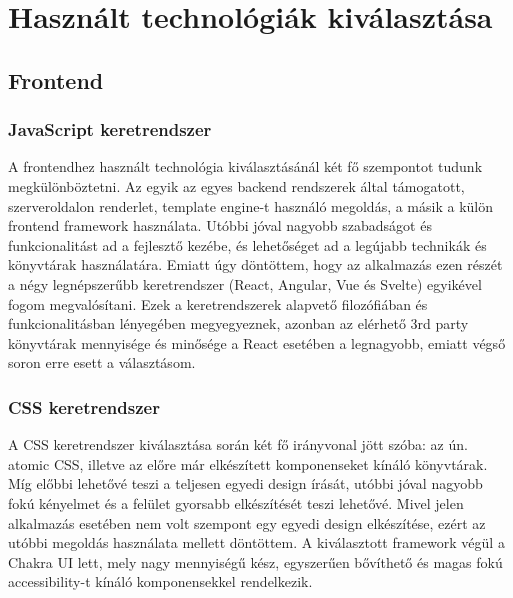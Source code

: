 \chapter{Használt technológiák kiválasztása}

\section{Frontend}
\subsection{JavaScript keretrendszer}
A frontendhez használt technológia kiválasztásánál két fő szempontot tudunk megkülönböztetni.
Az egyik az egyes backend rendszerek által támogatott, szerveroldalon renderlet, template engine-t használó megoldás, a másik a külön frontend framework használata.
Utóbbi jóval nagyobb szabadságot és funkcionalitást ad a fejlesztő kezébe, és lehetőséget ad a legújabb technikák és könyvtárak használatára.
Emiatt úgy döntöttem, hogy az alkalmazás ezen részét a négy legnépszerűbb keretrendszer (React, Angular, Vue és Svelte) egyikével fogom megvalósítani.
Ezek a keretrendszerek alapvető filozófiában és funkcionalitásban lényegében megyegyeznek, azonban az elérhető 3rd party könyvtárak mennyisége és minősége a React esetében a legnagyobb, emiatt végső soron erre esett a választásom.

\subsection{CSS keretrendszer}
A CSS keretrendszer kiválasztása során két fő irányvonal jött szóba: az ún. atomic CSS, illetve az előre már elkészített komponenseket kínáló könyvtárak.
Míg előbbi lehetővé teszi a teljesen egyedi design írását, utóbbi jóval nagyobb fokú kényelmet és a felület gyorsabb elkészítését teszi lehetővé.
Mivel jelen alkalmazás esetében nem volt szempont egy egyedi design elkészítése, ezért az utóbbi megoldás használata mellett döntöttem.
A kiválasztott framework végül a Chakra UI lett, mely nagy mennyiségű kész, egyszerűen bővíthető és magas fokú accessibility-t kínáló komponensekkel rendelkezik.

